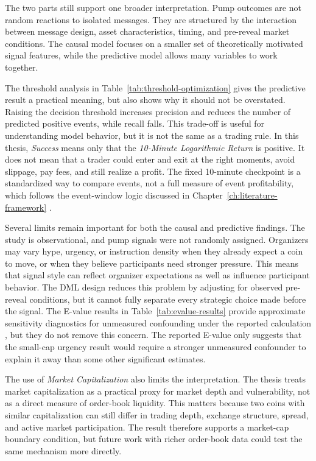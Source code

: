 The two parts still support one broader interpretation. Pump outcomes are not random reactions to isolated messages. They are structured by the interaction between message design, asset characteristics, timing, and pre-reveal market conditions. The causal model focuses on a smaller set of theoretically motivated signal features, while the predictive model allows many variables to work together. 

The threshold analysis in Table~\ref{tab:threshold-optimization} gives the predictive result a practical meaning, but also shows why it should not be overstated. Raising the decision threshold increases precision and reduces the number of predicted positive events, while recall falls. This trade-off is useful for understanding model behavior, but it is not the same as a trading rule. In this thesis, \textit{Success} means only that the \textit{10-Minute Logarithmic Return} is positive. It does not mean that a trader could enter and exit at the right moments, avoid slippage, pay fees, and still realize a profit. The fixed 10-minute checkpoint is a standardized way to compare events, not a full measure of event profitability, which follows the event-window logic discussed in Chapter~\ref{ch:literature-framework} \cite{li2021cryptocurrency, mackinlay1997event}.

Several limits remain important for both the causal and predictive findings. The study is observational, and pump signals were not randomly assigned. Organizers may vary hype, urgency, or instruction density when they already expect a coin to move, or when they believe participants need stronger pressure. This means that signal style can reflect organizer expectations as well as influence participant behavior. The DML design reduces this problem by adjusting for observed pre-reveal conditions, but it cannot fully separate every strategic choice made before the signal. The E-value results in Table~\ref{tab:evalue-results} provide approximate sensitivity diagnostics for unmeasured confounding under the reported calculation \cite{vanderweele2017sensitivity}, but they do not remove this concern. The reported E-value only suggests that the small-cap urgency result would require a stronger unmeasured confounder to explain it away than some other significant estimates.

The use of \textit{Market Capitalization} also limits the interpretation. The thesis treats market capitalization as a practical proxy for market depth and vulnerability, not as a direct measure of order-book liquidity. This matters because two coins with similar capitalization can still differ in trading depth, exchange structure, spread, and active market participation. The result therefore supports a market-cap boundary condition, but future work with richer order-book data could test the same mechanism more directly.

